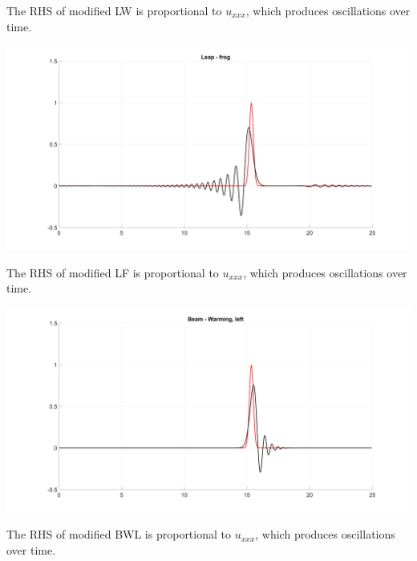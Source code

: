 \documentclass{article}
\begin{document}
\begin{enumerate}[label=(\alph*)]
\begin{center}
\end{center}
The RHS of modified LW is proportional to $u_{xxx}$, which produces oscillations over time.
\begin{center}
	\includegraphics[scale=.2]{hw11 LF}
\end{center}
The RHS of modified LF is proportional to $u_{xxx}$, which produces oscillations over time.
\begin{center}
	\includegraphics[scale=.2]{hw11 BWL}
\end{center}
The RHS of modified BWL is proportional to $u_{xxx}$, which produces oscillations over time.

\end{enumerate}


	
\end{document}
